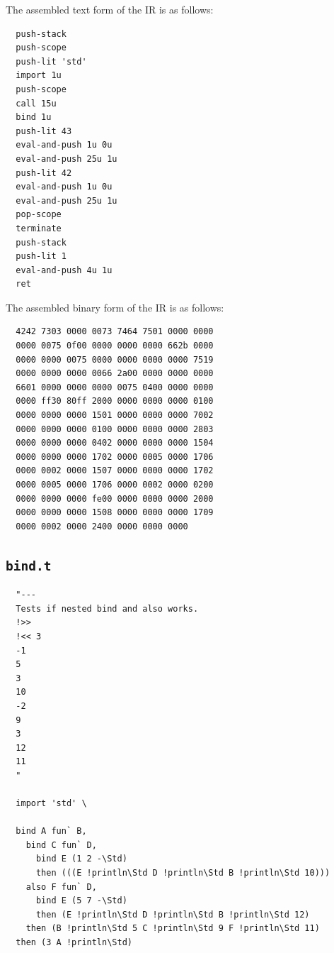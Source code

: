 \documentclass{report}
\begin{document}
The assembled text form of the IR is as follows:

\begin{mdframed}[style=example]
\begin{verbatim}
  push-stack
  push-scope
  push-lit 'std'
  import 1u
  push-scope
  call 15u
  bind 1u
  push-lit 43
  eval-and-push 1u 0u
  eval-and-push 25u 1u
  push-lit 42
  eval-and-push 1u 0u
  eval-and-push 25u 1u
  pop-scope
  terminate
  push-stack
  push-lit 1
  eval-and-push 4u 1u
  ret
\end{verbatim}
\end{mdframed}

The assembled binary form of the IR is as follows:

\begin{mdframed}[style=example]
\begin{verbatim}
  4242 7303 0000 0073 7464 7501 0000 0000
  0000 0075 0f00 0000 0000 0000 662b 0000
  0000 0000 0075 0000 0000 0000 0000 7519
  0000 0000 0000 0066 2a00 0000 0000 0000
  6601 0000 0000 0000 0075 0400 0000 0000
  0000 ff30 80ff 2000 0000 0000 0000 0100
  0000 0000 0000 1501 0000 0000 0000 7002
  0000 0000 0000 0100 0000 0000 0000 2803
  0000 0000 0000 0402 0000 0000 0000 1504
  0000 0000 0000 1702 0000 0005 0000 1706
  0000 0002 0000 1507 0000 0000 0000 1702
  0000 0005 0000 1706 0000 0002 0000 0200
  0000 0000 0000 fe00 0000 0000 0000 2000
  0000 0000 0000 1508 0000 0000 0000 1709
  0000 0002 0000 2400 0000 0000 0000
\end{verbatim}
\end{mdframed}

\subsection{\texttt{bind.t}}

\begin{mdframed}[style=example]
\begin{verbatim}
  "---
  Tests if nested bind and also works.
  !>>
  !<< 3
  -1
  5
  3
  10
  -2
  9
  3
  12
  11
  "

  import 'std' \

  bind A fun` B,
    bind C fun` D,
      bind E (1 2 -\Std)
      then (((E !println\Std D !println\Std B !println\Std 10)))
    also F fun` D,
      bind E (5 7 -\Std)
      then (E !println\Std D !println\Std B !println\Std 12)
    then (B !println\Std 5 C !println\Std 9 F !println\Std 11)
  then (3 A !println\Std)
\end{verbatim}
\end{mdframed}
\end{document}
